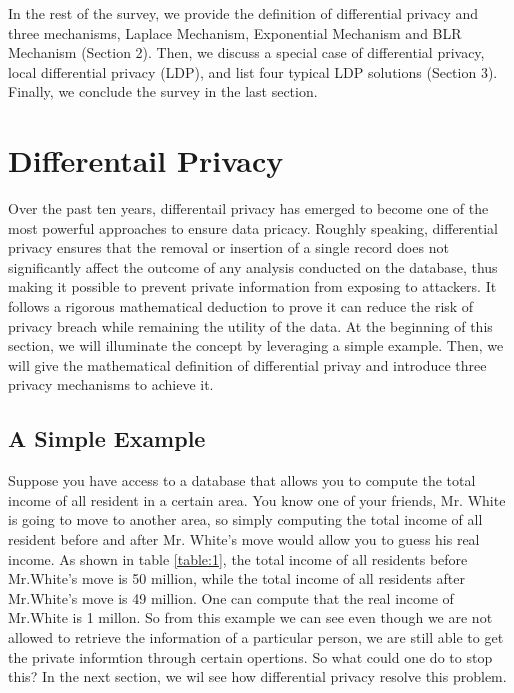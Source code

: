 \documentclass[a4paper, 11pt]{article} %
\begin{document}
In the rest of the survey, we provide the definition of differential privacy and three mechanisms, Laplace Mechanism, Exponential Mechanism and BLR Mechanism (Section 2). Then, we discuss a special case of differential privacy, local differential privacy (LDP), and list four typical LDP solutions (Section 3). Finally, we conclude the survey in the last section.



\section{Differentail Privacy}

Over the past ten years, differentail privacy\cite{dwork2008differential, dwork2014algorithmic} has emerged to become one of the most powerful approaches to ensure data pricacy. Roughly speaking, differential privacy ensures that the removal or insertion of a single record does not significantly affect the outcome of any analysis conducted on the database, thus making it possible to prevent private information from exposing to attackers. It follows a rigorous mathematical deduction to prove it can reduce the risk of privacy breach while remaining the utility of the data. At the beginning of this section, we will illuminate the concept by leveraging a simple example. Then, we will give the mathematical definition of differential privay and introduce three privacy mechanisms to achieve it.

\subsection{A Simple Example}
Suppose you have access to a database that allows you to compute the total income of all resident in a certain area. You know one of your friends, Mr. White is going to move to another area, so simply computing the total income of all resident before and after Mr. White's move would allow you to guess his real income. As shown in table \ref{table:1}, the total income of all residents before Mr.White's move is 50 million, while the total income of all residents after Mr.White's move is 49 million. One can compute that the real income of Mr.White is 1 millon. So from this example we can see even though we are not allowed to retrieve the information of a particular person, we are still able to get the private informtion through certain opertions. So what could one do to stop this? In the next section, we wil see how differential privacy resolve this problem.
\end{document}
